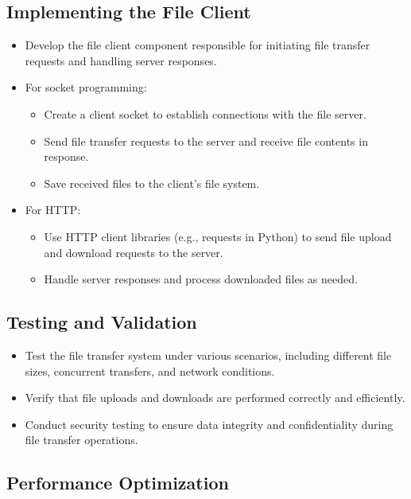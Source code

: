 \documentclass[11pt]{article}
\begin{document}
\subsection{Implementing the File Client}

\begin{itemize}
  \item Develop the file client component responsible for initiating file transfer requests and handling server responses.
  \item For socket programming:
    \begin{itemize}
      \item Create a client socket to establish connections with the file server.
      \item Send file transfer requests to the server and receive file contents in response.
      \item Save received files to the client's file system.
    \end{itemize}
  \item For HTTP:
    \begin{itemize}
      \item Use HTTP client libraries (e.g., requests in Python) to send file upload and download requests to the server.
      \item Handle server responses and process downloaded files as needed.
    \end{itemize}
\end{itemize}

\subsection{Testing and Validation}

\begin{itemize}
  \item Test the file transfer system under various scenarios, including different file sizes, concurrent transfers, and network conditions.
  \item Verify that file uploads and downloads are performed correctly and efficiently.
  \item Conduct security testing to ensure data integrity and confidentiality during file transfer operations.
\end{itemize}

\subsection{Performance Optimization}
\end{document}
